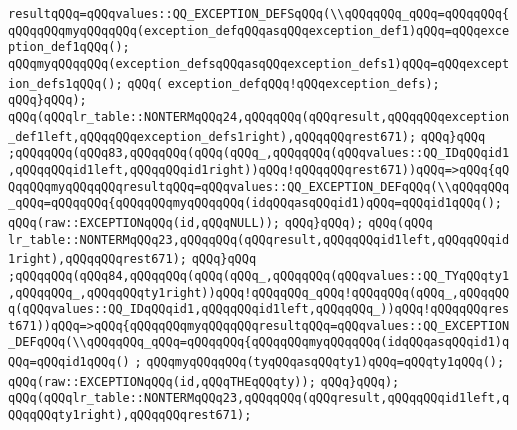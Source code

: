 \verb|resultqQQq=qQQqvalues::QQ_EXCEPTION_DEFSqQQq(\\qQQqqQQq_qQQq=qQQqqQQq{qQQqqQQqmyqQQqqQQq(exception_defqQQqasqQQqexception_def1)qQQq=qQQqexception_def1qQQq();|\newline
\verb|qQQqmyqQQqqQQq(exception_defsqQQqasqQQqexception_defs1)qQQq=qQQqexception_defs1qQQq();|\newline
\verb|qQQq(|\newline
\verb|exception_defqQQq!qQQqexception_defs);|\newline
\verb|qQQq}qQQq);|\newline
\verb|qQQq(qQQqlr_table::NONTERMqQQq24,qQQqqQQq(qQQqresult,qQQqqQQqexception_def1left,qQQqqQQqexception_defs1right),qQQqqQQqrest671);|\newline
\verb|qQQq}qQQq|\newline
\verb|;qQQqqQQq(qQQq83,qQQqqQQq(qQQq(qQQq_,qQQqqQQq(qQQqvalues::QQ_IDqQQqid1,qQQqqQQqid1left,qQQqqQQqid1right))qQQq!qQQqqQQqrest671))qQQq=>qQQq{qQQqqQQqmyqQQqqQQqresultqQQq=qQQqvalues::QQ_EXCEPTION_DEFqQQq(\\qQQqqQQq_qQQq=qQQqqQQq{qQQqqQQqmyqQQqqQQq(idqQQqasqQQqid1)qQQq=qQQqid1qQQq();|\newline
\verb|qQQq(raw::EXCEPTIONqQQq(id,qQQqNULL));|\newline
\verb|qQQq}qQQq);|\newline
\verb|qQQq(qQQq|\newline
\verb|lr_table::NONTERMqQQq23,qQQqqQQq(qQQqresult,qQQqqQQqid1left,qQQqqQQqid1right),qQQqqQQqrest671);|\newline
\verb|qQQq}qQQq|\newline
\verb|;qQQqqQQq(qQQq84,qQQqqQQq(qQQq(qQQq_,qQQqqQQq(qQQqvalues::QQ_TYqQQqty1,qQQqqQQq_,qQQqqQQqty1right))qQQq!qQQqqQQq_qQQq!qQQqqQQq(qQQq_,qQQqqQQq(qQQqvalues::QQ_IDqQQqid1,qQQqqQQqid1left,qQQqqQQq_))qQQq!qQQqqQQqrest671))qQQq=>qQQq{qQQqqQQqmyqQQqqQQqresultqQQq=qQQqvalues::QQ_EXCEPTION_DEFqQQq(\\qQQqqQQq_qQQq=qQQqqQQq{qQQqqQQqmyqQQqqQQq(idqQQqasqQQqid1)qQQq=qQQqid1qQQq()|\newline
\verb|;|\newline
\verb|qQQqmyqQQqqQQq(tyqQQqasqQQqty1)qQQq=qQQqty1qQQq();|\newline
\verb|qQQq(raw::EXCEPTIONqQQq(id,qQQqTHEqQQqty));|\newline
\verb|qQQq}qQQq);|\newline
\verb|qQQq(qQQqlr_table::NONTERMqQQq23,qQQqqQQq(qQQqresult,qQQqqQQqid1left,qQQqqQQqty1right),qQQqqQQqrest671);|\newline
